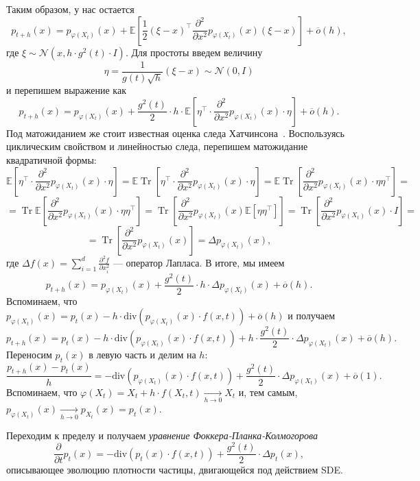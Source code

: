 \documentclass[12pt]{article}
\DeclareMathOperator{\Tr}{Tr}
\theoremstyle{definition}
\begin{document}
Таким образом, у нас остается
\[
    p_{t + h}(x) = p_{\varphi(X_t)}(x) + \mathbb{E}\left[ \frac{1}{2}(\xi - x)^\top \frac{\partial^2}{\partial x^2} p_{\varphi(X_t)}(x) (\xi - x)\right] + \overline{o}(h),
\]
где $\xi \sim \mathcal{N}(x, h \cdot g^2(t) \cdot I)$. Для простоты введем величину 
\[
    \eta = \frac{1}{g(t) \sqrt{h}}(\xi - x) \sim \mathcal{N}(0, I)
\]
и перепишем выражение как 
\[
    p_{t + h}(x) = p_{\varphi(X_t)}(x) + \frac{g^2(t)}{2} \cdot h \cdot \mathbb{E}\left[\eta^\top \cdot \frac{\partial^2}{\partial x^2} p_{\varphi(X_t)}(x) \cdot \eta \right] + \overline{o}(h).
\]
Под матожиданием же стоит известная оценка следа Хатчинсона~\cite{hutchinson1989stochastic}. Воспользуясь циклическим свойством и линейностью следа, перепишем матожидание квадратичной формы:
\[
    \mathbb{E}\left[\eta^\top \cdot \frac{\partial^2}{\partial x^2} p_{\varphi(X_t)}(x) \cdot \eta \right] = \mathbb{E}\Tr\left[\eta^\top \cdot \frac{\partial^2}{\partial x^2} p_{\varphi(X_t)}(x) \cdot \eta \right] = \mathbb{E}\Tr\left[\frac{\partial^2}{\partial x^2} p_{\varphi(X_t)}(x) \cdot \eta \eta^\top \right] =
\]
\[
    = \Tr \mathbb{E} \left[ \frac{\partial^2}{\partial x^2} p_{\varphi(X_t)}(x) \cdot \eta \eta^\top \right] = \Tr \left[\frac{\partial^2}{\partial x^2} p_{\varphi(X_t)}(x) \mathbb{E}\left[ \eta \eta^\top \right] \right] = \Tr \left[\frac{\partial^2}{\partial x^2} p_{\varphi(X_t)}(x) \cdot I \right] = 
\]
\[
    = \Tr \left[\frac{\partial^2}{\partial x^2} p_{\varphi(X_t)}(x)\right] = \Delta p_{\varphi(X_t)}(x),
\]
где $\Delta f(x) = \sum_{i = 1}^{d} \frac{\partial^2 f}{\partial x_i^2}$ --- оператор Лапласа. В итоге, мы имеем
\[
    p_{t + h}(x) = p_{\varphi(X_t)}(x) + \frac{g^2(t)}{2} \cdot h \cdot \Delta p_{\varphi(X_t)}(x) + \overline{o}(h).
\]
Вспоминаем, что $p_{\varphi(X_t)}(x) = p_t(x) - h \cdot \text{div}(p_{\varphi(X_t)}(x) \cdot f(x, t)) + \overline{o}(h)$ и получаем
\[
    p_{t + h}(x) = p_t(x) - h \cdot \text{div}\left(p_{\varphi(X_t)}(x) \cdot f(x, t)\right) + h \cdot \frac{g^2(t)}{2} \cdot \Delta p_{\varphi(X_t)}(x) + \overline{o}(h).
\]
Переносим $p_t(x)$ в левую часть и делим на $h$:
\[
    \frac{p_{t + h}(x) - p_t(x)}{h} = -\text{div}\left(p_{\varphi(X_t)}(x) \cdot f(x, t)\right) + \frac{g^2(t)}{2} \cdot \Delta p_{\varphi(X_t)}(x) + \overline{o}(1).
\]
Вспоминаем, что $\varphi(X_t) = X_t + h \cdot f(X_t, t) \xrightarrow[h \rightarrow 0]{} X_t$ и, тем самым, $p_{\varphi(X_t)}(x) \xrightarrow[h \rightarrow 0]{} p_{X_t}(x) = p_t(x)$. 

Переходим к пределу и получаем \emph{уравнение Фоккера-Планка-Колмогорова}
\begin{equation}
    \frac{\partial}{\partial t} p_t(x) = -\text{div}\left(p_t(x) \cdot f(x, t)\right) + \frac{g^2(t)}{2} \cdot \Delta p_t(x),
\end{equation}
описывающее эволюцию плотности частицы, двигающейся под действием SDE.
\end{document}
